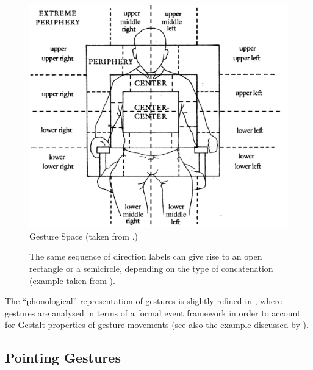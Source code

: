 \documentclass[output=paper]{langsci/langscibook}
\begin{document}
\begin{figure}[tb]
  \centering
  \includegraphics[width=0.5\linewidth]{figures/gesture-space}
  \caption[Gesture Space]{Gesture Space (taken from \citet[378]{McNeill:1992}.)}
  \label{fig:gesture-space}
\end{figure}


\begin{figure}[tb]
  \centering
  \caption{The same sequence of direction labels can give rise to an open rectangle or a semicircle, depending on the type of concatenation (example taken from \citet{Luecking:2016}).}
  \label{fig:move-direction}
\end{figure}


The \enquote{phonological} representation of gestures is slightly refined in \citet{Luecking:2016}, where gestures are analysed in terms of a formal event framework \citep{Fernando:2011,Cooper:Ginzburg:2015} in order to account for Gestalt properties of gesture movements (see also the example discussed by \citet{Rieser:2008}).



\subsection{Pointing Gestures}
\label{sec:pointing-gestures}
\end{document}
